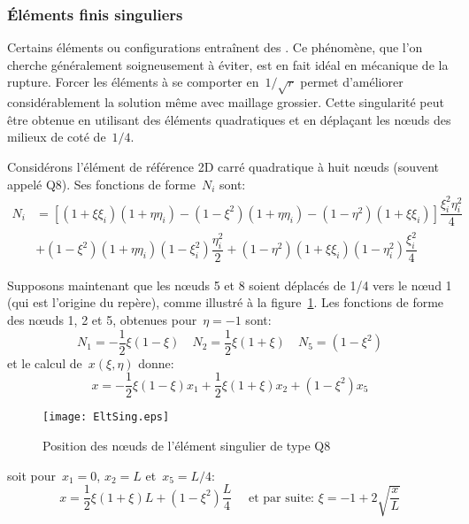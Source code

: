 \medskip
\subsubsection{Éléments finis singuliers}

Certains éléments ou configurations entraînent des . Ce phénomène, que l'on cherche généralement soigneusement à éviter, est en fait idéal en mécanique de la rupture. Forcer les éléments à se comporter en~$1/\sqrt{r}$ permet d'améliorer considérablement la solution même avec maillage grossier. Cette singularité peut être obtenue en utilisant des éléments quadratiques et en déplaçant les nœuds des milieux de coté de~$1/4$.

\medskip
Considérons l'élément de référence 2D carré quadratique à huit nœuds (souvent appelé Q8). Ses fonctions de forme~$N_i$ sont:
\begin{equation} \begin{aligned}
N_i &=\left[ (1+\xi\xi_i)(1+\eta\eta_i)-(1-\xi^2)(1+\eta\eta_i)-(1-\eta^2)(1+\xi\xi_i)\right]
\dfrac{\xi_i^2\eta_i^2}4 \\
& +
(1-\xi^2)(1+\eta\eta_i)(1-\xi_i^2)\dfrac{\eta_i^2}2 +
(1-\eta^2)(1+\xi\xi_i)(1-\eta_i^2)\dfrac{\xi_i^2}4
\end{aligned}\end{equation}

Supposons maintenant que les nœuds 5 et 8 soient déplacés de 1/4 vers le nœud 1 (qui est l'origine du repère), comme illustré à la figure~\ref{fig-EltSing}. Les fonctions de forme des nœuds 1, 2 et 5, obtenues pour~$\eta=-1$ sont:
\begin{equation} N_1= -\frac12\xi(1-\xi) \quad
 N_2 = \frac12\xi(1+\xi) \quad
 N_5 = (1-\xi^2)
\end{equation}
et le calcul de~$x(\xi,\eta)$ donne:
\begin{equation} x = -\frac12\xi(1-\xi)x_1 + \frac12\xi(1+\xi)x_2 + (1-\xi^2)x_5 \end{equation}
\begin{figure}[ht]\centering
\texttt{[image: EltSing.eps]}
\caption{Position des nœuds de l'élément singulier de type Q8}\label{fig-EltSing}
\end{figure}
soit pour~$x_1=0$, $x_2=L$ et~$x_5=L/4$:
\begin{equation} x = \frac12\xi(1+\xi)L + (1-\xi^2)\frac{L}4 \quad \text{ et par suite: }
\xi=-1+2\sqrt{\frac{x}L} \end{equation}

